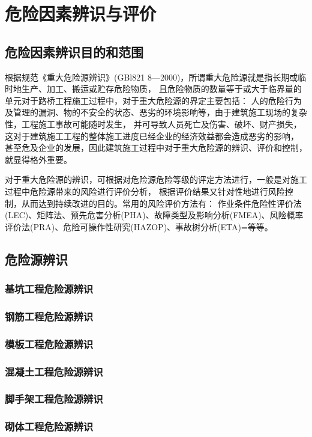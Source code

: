 \section{危险因素辨识与评价}

\subsection{危险因素辨识目的和范围}

根据规范《重大危险源辨识》(GBl821 8—2000)，所谓重大危险源就是指长期或临时地生产、加工、搬运或贮存危险物质，
且危险物质的数量等于或大于临界量的单元对于路桥工程施工过程中，对于重大危险源的界定主要包括：
人的危险行为及管理的漏洞、物的不安全的状态、恶劣的环境影响等，由于建筑施工现场的复杂性，工程施工事故可能随时发生，
并可导致人员死亡及伤害、破坏、财产损失，这对于建筑施工工程的整体施工进度已经企业的经济效益都会造成恶劣的影响，
甚至危及企业的发展，因此建筑施工过程中对于重大危险源的辨识、评价和控制，就显得格外重要。

对于重大危险源的辨识，可根据对危险源危险等级的评定方法进行，一般是对施工过程中危险源带来的风险进行评价分析，
根据评价结果又针对性地进行风险控制，从而达到持续改进的目的。常用的风险评价方法有：
作业条件危险性评价法(LEC)、矩阵法、预先危害分析(PHA)、故障类型及影响分析(FMEA)、风险概率评价法(PRA)、危险可操作性研究(HAZOP)、事故树分析(ETA)=等等。

\subsection{危险源辨识}
\subsubsection{基坑工程危险源辨识}
\subsubsection{钢筋工程危险源辨识}
\subsubsection{模板工程危险源辨识}
\subsubsection{混凝土工程危险源辨识}
\subsubsection{脚手架工程危险源辨识}
\subsubsection{砌体工程危险源辨识}
